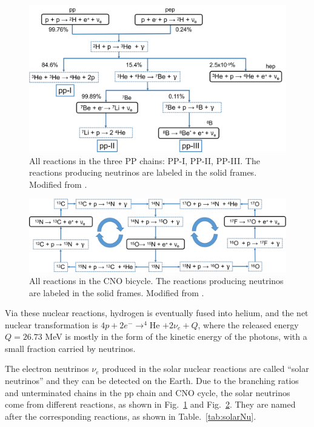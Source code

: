 \begin{figure}[htbp]
	\centering	
	\includegraphics[width=14cm]{ppChain.png}
	\caption[All reactions in the three PP chains.]{All reactions in the three PP chains: PP-I, PP-II, PP-III. The reactions producing neutrinos are labeled in the solid frames. Modified from \cite{oberauer2020solar}.	\label{fig:ppChain}}
\end{figure}

\begin{figure}[htbp]
	\centering	
	\includegraphics[width=14cm]{CNOcycle.png}
	\caption[All reactions in the CNO bicycle.]{All reactions in the CNO bicycle. The reactions producing neutrinos are labeled in the solid frames. Modified from \cite{oberauer2020solar}.	\label{fig:CNOcycle}}
\end{figure}

Via these nuclear reactions, hydrogen is eventually fused into helium, and the net nuclear transformation is $4p+2e^-\to^{4}$He $+2\nu_e+Q$, where the released energy $Q=26.73$ MeV is mostly in the form of the kinetic energy of the photons, with a small fraction carried by neutrinos\cite{antonio2018state,valle2015neutrinos}.

The electron neutrinos $\nu_e$ produced in the solar nuclear reactions are called ``solar neutrinos'' and they can be detected on the Earth. Due to the branching ratios and unterminated chains in the pp chain and CNO cycle, the solar neutrinos come from different reactions, as shown in Fig.~\ref{fig:ppChain} and Fig.~\ref{fig:CNOcycle}. They are named after the corresponding reactions, as shown in Table.~\ref{tab:solarNu}.

